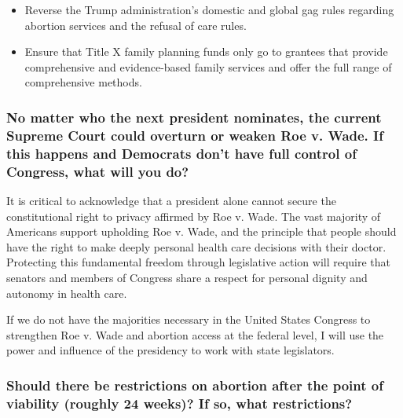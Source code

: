 \begin{itemize}
\item
  Reverse the Trump administration's domestic and global gag rules
  regarding abortion services and the refusal of care rules.
\item
  Ensure that Title X family planning funds only go to grantees that
  provide comprehensive and evidence-based family services and offer the
  full range of comprehensive methods.
\end{itemize}

\hypertarget{no-matter-who-the-next-president-nominates-the-current-supreme-court-could-overturn-or-weaken-roe-v-wade-if-this-happens-and-democrats-dont-have-full-control-of-congress-what-will-you-do-2}{%
\subsubsection{No matter who the next president nominates, the current
Supreme Court could overturn or weaken Roe v. Wade. If this happens and
Democrats don't have full control of Congress, what will you
do?}\label{no-matter-who-the-next-president-nominates-the-current-supreme-court-could-overturn-or-weaken-roe-v-wade-if-this-happens-and-democrats-dont-have-full-control-of-congress-what-will-you-do-2}}

It is critical to acknowledge that a president alone cannot secure the
constitutional right to privacy affirmed by Roe v. Wade. The vast
majority of Americans support upholding Roe v. Wade, and the principle
that people should have the right to make deeply personal health care
decisions with their doctor. Protecting this fundamental freedom through
legislative action will require that senators and members of Congress
share a respect for personal dignity and autonomy in health care.

If we do not have the majorities necessary in the United States Congress
to strengthen Roe v. Wade and abortion access at the federal level, I
will use the power and influence of the presidency to work with state
legislators.

\hypertarget{should-there-be-restrictions-on-abortion-after-the-point-of-viability-roughly-24-weeks-if-so-what-restrictions-2}{%
\subsubsection{Should there be restrictions on abortion after the point
of viability (roughly 24 weeks)? If so, what
restrictions?}\label{should-there-be-restrictions-on-abortion-after-the-point-of-viability-roughly-24-weeks-if-so-what-restrictions-2}}

